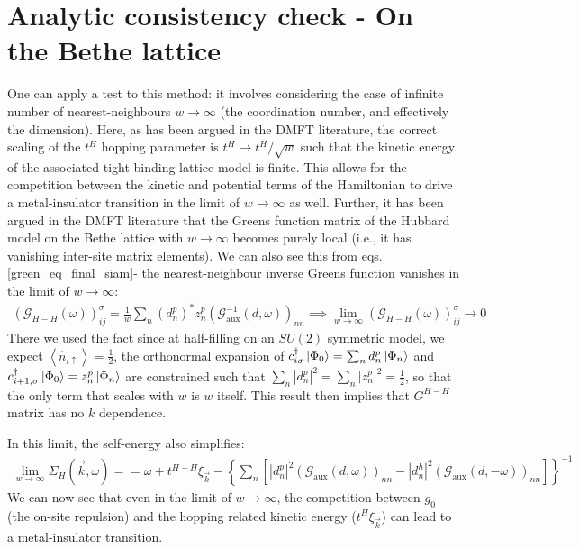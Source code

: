 \documentclass[10pt]{report}
\numberwithin{equation}{section}
\begin{document}
\section{Analytic consistency check - On the Bethe lattice}
One can apply a test to this method: it involves considering the case of infinite number of nearest-neighbours $w\to\infty$ (the coordination number, and effectively the dimension). Here, as has been argued in the DMFT literature, the correct scaling of the $t^{H}$ hopping parameter is $t^{H}\to t^{H}/\sqrt{w}$ such that the kinetic energy of the associated tight-binding lattice model is finite. This allows for the competition between the kinetic and potential terms of the Hamiltonian to drive a metal-insulator transition in the limit of $w\to\infty$ as well. Further, it has been argued in the DMFT literature that the Greens function matrix of the Hubbard model on the Bethe lattice with $w\to\infty$ becomes purely local (i.e., it has vanishing inter-site matrix elements). We can also see this from eqs.\eqref{green_eq_final_siam}- the nearest-neighbour inverse Greens function vanishes in the limit of $w \to \infty$:
\begin{equation}\begin{aligned}
	\left(\mathcal{G}_{H-H}(\omega)\right)_{ij}^\sigma = \frac{1}{w} \sum_n \left(d^p_n\right)^* z^p_n \left(\mathcal{G}^{-1}_\text{aux}(d, \omega) \right)_{nn} \implies \lim_{w \to \infty}\left(\mathcal{G}_{H-H}(\omega)\right)_{ij}^\sigma \to 0
\end{aligned}\end{equation}
There we used the fact since at half-filling on an $SU(2)$ symmetric model, we expect $\left<\hat n_{i \uparrow} \right> = \frac{1}{2}$, the orthonormal expansion of $c^\dagger_{i \sigma}\ket{\Phi_0} = \sum_n d^p_n \ket{\Phi_n}$ and \(c^\dagger_{i+1,\sigma}\ket{\Phi_0}=z^p_n\ket{\Phi_n}\) are constrained such that $\sum_n |d^p_n|^2 = \sum_n |z^p_n|^2 = \frac{1}{2}$, so that the only term that scales with $w$ is $w$ itself. This result then implies that $G^{H-H}$ matrix has no $k$ dependence. 

In this limit, the self-energy also simplifies:
\begin{equation}\begin{aligned}
	\lim_{w \to \infty}\Sigma_H(\vec k,\omega) = = \omega +t^{H-H}\xi_{\vec k} - \left\{\sum_n \left[|d^p_n|^2  \left(\mathcal{G}_\text{aux}(d, \omega)\right)_{nn}- |d^h_n|^2 \left(\mathcal{G}_\text{aux}(d, -\omega)\right)_{nn}\right]\right\}^{-1}
\end{aligned}\end{equation}
We can now see that even in the limit of $w\to\infty$, the competition between ${g}_{0}$ (the on-site repulsion) and the hopping related kinetic energy ($t^{H}\xi_{\vec{k}}$) can lead to a metal-insulator transition.
\end{document}
